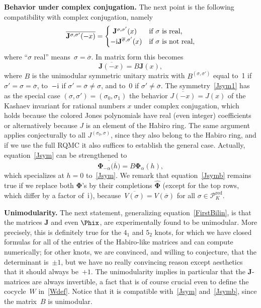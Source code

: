 \documentclass[pdftex]{sigma}
\numberwithin{equation}{section}
\def\Phih{\widehat\Phi}
\def\a{\alpha}
\def\a{\alpha}
\def\s{\sigma}
\def\J{\mathbf J} \def\J{J} %
\def\be{\begin{equation}}
\def\ee{\end{equation}}
\def\bJ{J} \def\bJ{\mathbf{J}}
\def\bPhi{\mathbf\Phi}
\def\bPhih{\mathbf{\Phih}}
\def\RED{^{\text{red}}}
\def\calPx{\mathcal{P}\RED} %
\begin{document}
{\bf Behavior under complex conjugation.}
The next point is the following compatibility with complex conjugation, namely
\be
\label{Jsym1}
\overline{\bJ^{\s,\s'}(-x)}
= \begin{cases} \hphantom{i}\bJ^{\s,\s'}(x)& \text{if $\s$ is real,} \\
 -{\rm i}\bJ^{\overline\s,\s'}(x)&\text{if $\s$ is not real,}\end{cases}
\ee
where
``$\s$ real'' means~$\s=\overline\s$. In matrix form this becomes
\be
\label{Jsym}
\overline{\bJ(-x)} = B \bJ(x) ,
\ee
where $B$ is the unimodular symmetric unitary matrix with $B^{(\s,\s')}$
equal to~1 if ${\s'=\s=\overline\s}$, to~$-{\rm i}$ if $\s'=\overline\s\ne\s$, and to~0
if $\s'\ne\overline\s$.
The symmetry~\eqref{Jsym1} has as the special case ${(\s,\s')=(\s_0,\s_1)}$ the behavior
$\overline{\J(-x)} = \J(x)$ of the Kashaev invariant for rational numbers $x$ under
complex conjugation, which holds because the colored Jones polynomials have real (even
integer) coefficients or alternatively because $\J$ is an element of the Habiro ring.
The same argument applies conjecturally to all $J^{(\s_0,\s)}$, since they also belong
to the Habiro ring, and if we use the full RQMC it also suffices to establish
the general case. Actually, equation~\eqref{Jsym} can be strengthened to
\be
\label{Jsymb}
\overline{\bPhi_{-\a}\big(\overline h\big)} = B  \bPhi_{\a}(h),
\ee
which specializes at $h=0$ to~\eqref{Jsym}. We remark that equation~\eqref{Jsymb}
remains true if we replace both $\bPhi$'s by their completions $\bPhih$ (except for
the top rows, which differ by a factor of~${\rm i}$), because~${\overline{V(\s)}=V(\overline\s)}$
for all $\s\in\calPx_K$.

{\bf Unimodularity.}
The next statement, generalizing equation~\eqref{FirstBilin}, is that the matrices $\bJ$
and even $\Phix$, are experimentally found to be unimodular. More precisely, this is
definitely true for the $4_1$ and $5_2$ knots, for which we have closed formulas for
all of the entries of the Habiro-like matrices and can compute numerically; for other
knots, we are convinced, and willing to conjecture, that the determinant is~$\pm1$,
but we have no really convincing reason except aesthetics that it should always be~$+1$.
The unimodularity implies in particular that the $\bJ$-matrices are always invertible,
a fact that is of course crucial even to define the cocycle~$W$ in~\eqref{Wdef}.
Notice that it is compatible with~\eqref{Jsym} and~\eqref{Jsymb}, since
the matrix~$B$ is unimodular.
\end{document}

